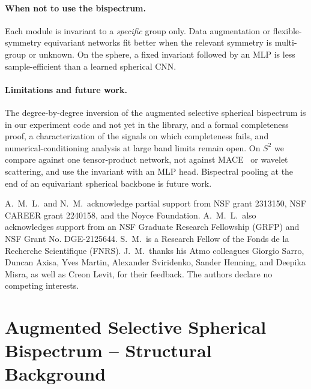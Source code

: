 \documentclass{article}
\theoremstyle{definition}
\theoremstyle{remark}
\theoremstyle{definition}
\begin{document}
\paragraph{When not to use the bispectrum.}
Each module is invariant to a \emph{specific} group only. Data augmentation or
flexible-symmetry equivariant networks fit better when the relevant symmetry is multi-group or
unknown. On the sphere, a fixed invariant followed by an MLP is less sample-efficient than a
learned spherical CNN.

\paragraph{Limitations and future work.}
The degree-by-degree inversion of the augmented selective spherical bispectrum is in our experiment code and not yet in the library, and a formal completeness proof, a characterization of the signals on which completeness fails,
and numerical-conditioning analysis at large band limits remain open. On $S^2$ we compare
against one tensor-product network, not against MACE~\citep{batatia2022mace} or wavelet
scattering, and use the invariant with an MLP head. Bispectral pooling at the end of an
equivariant spherical backbone is future work.

\begin{ack}
A.~M.~L.\ and N.~M.\ acknowledge partial support from NSF grant 2313150, NSF CAREER grant
2240158, and the Noyce Foundation. A.~M.~L.\ also acknowledges support from an NSF Graduate
Research Fellowship (GRFP) and NSF Grant No. DGE-2125644. S.~M.\ is a Research Fellow of the
Fonds de la Recherche Scientifique (FNRS). J.~M.\ thanks his Atmo colleagues Giorgio Sarro, Duncan Axisa, Yves
Martin, Alexander Sviridenko, Sander Henning, and Deepika Misra, as well as Creon Levit, for their
feedback. The authors declare no competing interests.
\end{ack}




\appendix

\section{Augmented Selective Spherical Bispectrum -- Structural Background}
\label{app:so3-proof}
\end{document}
